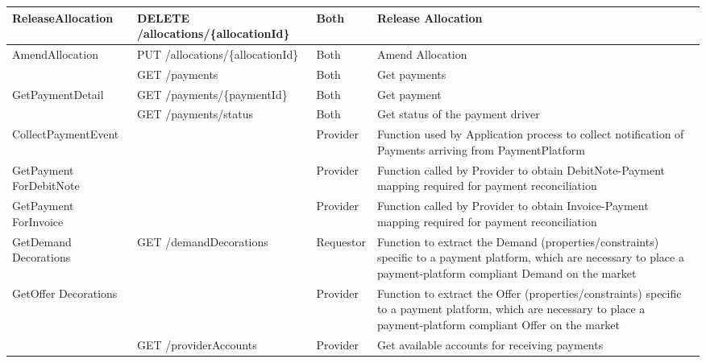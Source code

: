 \begin{enumerate}
\begin{enumerate}
\begin{table}[H]
\begin{center}
\begin{tabular}{|p{3cm}|p{7cm}|p{1.5cm}|p{4cm}|}
ReleaseAllocation		&	DELETE /allocations/\{allocationId\} 		&	Both		&	Release Allocation	\\
\hline

AmendAllocation			&	PUT /allocations/\{allocationId\} 			&	Both		&	Amend Allocation	\\
\hline

						&	GET /payments 								&	Both 		& 	Get payments \\
\hline

GetPaymentDetail		&	GET /payments/\{paymentId\}					&	Both 		&	Get payment \\
\hline

						& 	GET /payments/status 						& 	Both 		& 	Get status of the payment driver \\
\hline

CollectPaymentEvent		&												&	Provider 	&	Function used by Application process to 
																							collect notification of Payments arriving from PaymentPlatform \\
\hline

GetPayment ForDebitNote	&												&	Provider 	&	Function called by Provider to
																							obtain DebitNote-Payment mapping
																							required for payment reconciliation \\
\hline

GetPayment ForInvoice	&												&	Provider 	&	Function called by Provider to
																							obtain Invoice-Payment mapping
																							required for payment reconciliation \\
\hline

GetDemand Decorations	&	GET /demandDecorations 						&	Requestor	&	Function to extract the Demand (properties/constraints) specific to
																							a payment platform, which are necessary to place 
																							a payment-platform compliant Demand on the market \\
\hline

GetOffer Decorations	&						 						&	Provider	&	Function to extract the Offer (properties/constraints) specific to
																							a payment platform, which are necessary to place 
																							a payment-platform compliant Offer on the market \\
\hline
																									
						&	GET /providerAccounts						&	Provider 	&	Get available accounts for receiving payments \\
\hline


\end{tabular}
\end{center}
\end{table}
\end{enumerate}
\end{enumerate}
